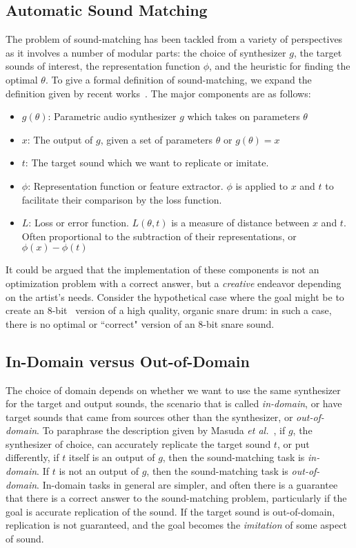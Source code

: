 \documentclass[lettersize,journal]{IEEEtran}
\newcommand{\highlight}[1]{\textcolor[RGB]{00,100,100}{#1}}
\begin{document}
\subsection{Automatic Sound Matching}
\label{sec:sound_matching_definition}
The problem of sound-matching has been tackled from a variety of perspectives as it involves a number of modular parts: the choice of synthesizer $g$, the target sounds of interest, the representation function $\phi$, and the heuristic for finding the optimal $\theta$. To give a formal definition of sound-matching, we expand the definition given by recent works~\cite{vahidi2023mesostructures,han2023perceptual}. The major components are as follows: 
\begin{itemize}
    \item $g(\theta)$: Parametric audio synthesizer $g$ which takes on parameters $\theta$ 
    \item $x$: The output of $g$, given a set of parameters $\theta$ or $g(\theta) = x$ 
    \item $t$: The target sound which we want to replicate or imitate. 
    \item $\phi$: Representation function or feature extractor. $\phi$ is applied to $x$ and $t$ to facilitate their comparison by the loss function.
    \item $L$: Loss or error function. $L(\theta,t)$ is a measure of distance between $x$ and $t$. Often proportional to the subtraction of their representations, or $ \phi(x) - \phi(t)$
\end{itemize}

\highlight{It could be argued that the implementation of these components is not an optimization problem with a correct answer, but a \textit{creative} endeavor depending on the artist's needs}. Consider the hypothetical case where the goal might be to create an 8-bit~\cite{collins2007loop} version of a high quality, organic snare drum: in such a case, there is no optimal or ``correct" version of an 8-bit snare sound. 

\subsection{In-Domain versus Out-of-Domain}
\label{sec:in-domain}
The choice of domain depends on whether we want to use the same synthesizer for the target and output sounds, the scenario that is called \textit{in-domain}, or have target sounds that came from sources other than the synthesizer, or \textit{out-of-domain}. To paraphrase the description given by Masuda \textit{et al.}~\cite{masuda2021soundmatch}, if $g$, the synthesizer of choice, can accurately replicate the target sound $t$, or put differently, if $t$ itself is an output of $g$, then the sound-matching task is \textit{in-domain}. If $t$ is not an output of $g$, then the sound-matching task is \textit{out-of-domain}. In-domain tasks in general are simpler, and often there is a guarantee that there is a correct answer to the sound-matching problem, particularly if the goal is accurate replication of the sound. If the target sound is out-of-domain, replication is not guaranteed, and the goal becomes the \textit{imitation} of some aspect of sound. 
\end{document}
